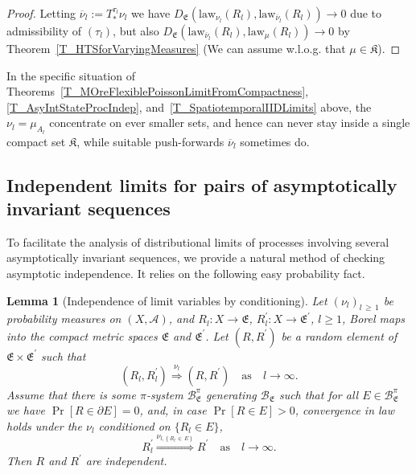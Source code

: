 \documentclass[10pt]{amsart}
\newtheorem{lemm}[theo]{Lemma}\newtheorem{prop}[theo]{Proposition}\newtheorem{coro}[theo]{Corollary}\newtheorem{conj}[theo]{Conjecture}
\theoremstyle{definition}\newtheorem{defi}[theo]{Definition}\newtheorem{rema}[theo]{Remark}\newtheorem{exam}[theo]{Example}\newtheorem{exem}[theo]{Example}\newtheorem{nota}[theo]{Notation}
\newcommand{\clA}{\mathcal{A}}
\newcommand{\clB}{\mathcal{B}}
\newcommand{\law}{\mathrm{law}}
\newcommand{\frkK}{\mathfrak{K}}
\newcommand{\frkE}{\mathfrak{E}}
\begin{document}
\begin{proof}
Letting $\overline{\nu}_{l}:=T_{\ast}^{\tau_{l}}\nu_{l}$ we have $D_{\frkE}(\law_{\nu_{l}}(R_{l}),\law_{\overline{\nu }_{l}}(R_{l}))\rightarrow0$ due to admissibility of $(\tau_{l})$, but also $D_{\frkE}(\law_{\overline{\nu}_{l}}(R_{l}),\law_{\mu }(R_{l}))\rightarrow0$ by Theorem~\ref{T_HTSforVaryingMeasures} (We can assume w.l.o.g. that $\mu\in\frkK$).
\end{proof}



In the specific situation of Theorems~\ref{T_MOreFlexiblePoissonLimitFromCompactness}, \ref{T_AsyIntStateProcIndep}, and~\ref{T_SpatiotemporalIIDLimits} above, the $\nu_{l}=\mu_{A_{l}}$ concentrate on ever smaller sets, and hence can never stay inside a single compact set $\frkK$, while suitable push-forwards $\overline{\nu}_{l} $ sometimes do.


\subsection{Independent limits for pairs of asymptotically invariant sequences}
To facilitate the analysis of distributional limits of processes involving several asymptotically invariant sequences, we provide a natural method of checking asymptotic independence. It relies on the following easy probability fact.

\begin{lemm}[{Independence of limit variables by conditioning}]\label{L_IndependentLimitPair}
Let $(\nu_{l})_{l\,\geq\,1}$ be probability measures on $(X,\clA)$, and $R_{l}:X\rightarrow\frkE$, $R_{l}^{\prime }:X\rightarrow\frkE^{\prime}$, $l\geq1$, Borel maps into the compact metric spaces $\frkE$ and $\frkE^{\prime}$. Let $(R,R^{\prime})$ be a random element of $\frkE\times\frkE^{\prime}$ such that
\begin{equation}\label{Eq_hdgsvczwetv}
\left(R_{l},R_{l}^{\prime}\right)\overset{\nu_{l}}{\Longrightarrow}\left(R,R^{\prime}\right)\quad\text{as}\quad l\rightarrow\infty\text{.} 
\end{equation}
Assume that there is some $\pi$-system $\clB_{\frkE}^{\pi}$ generating $\clB_{\frkE}$ such that for all $E\in\clB _{\frkE}^{\pi}$ we have $\Pr[R\in\partial E]=0$, and, in case $\Pr[R\in E]>0$, convergence in law holds under the $\nu_{l}$ conditioned on $\{R_{l}\in E\}$,
\begin{equation}\label{Eq_utioioio}
R_{l}^{\prime}\overset{\nu_{l,\left\{R_{l}\,\in\,E\right\}}}{\Longrightarrow}R^{\prime }\quad\text{as}\quad l\rightarrow\infty . 
\end{equation}
Then $R$ and $R^{\prime}$ are independent.
\end{lemm}
\end{document}
